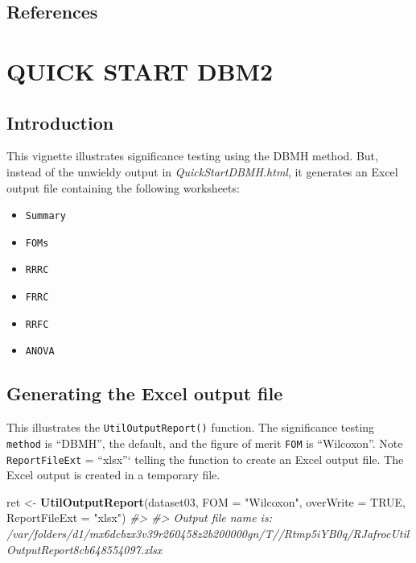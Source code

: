 \documentclass[]{book}
\newenvironment{Shaded}{\begin{snugshade}}{\end{snugshade}}
\newcommand{\CommentTok}[1]{\textcolor[rgb]{0.56,0.35,0.01}{\textit{#1}}}
\newcommand{\DataTypeTok}[1]{\textcolor[rgb]{0.13,0.29,0.53}{#1}}
\newcommand{\KeywordTok}[1]{\textcolor[rgb]{0.13,0.29,0.53}{\textbf{#1}}}
\newcommand{\NormalTok}[1]{#1}
\newcommand{\OtherTok}[1]{\textcolor[rgb]{0.56,0.35,0.01}{#1}}
\newcommand{\StringTok}[1]{\textcolor[rgb]{0.31,0.60,0.02}{#1}}
\providecommand{\tightlist}{%
  \setlength{\itemsep}{0pt}\setlength{\parskip}{0pt}}
\begin{document}
\hypertarget{references-5}{%
\section{References}\label{references-5}}

\hypertarget{QuickStartDBM2}{%
\chapter{QUICK START DBM2}\label{QuickStartDBM2}}

\hypertarget{introduction-5}{%
\section{Introduction}\label{introduction-5}}

This vignette illustrates significance testing using the DBMH method. But, instead of the unwieldy output in \emph{QuickStartDBMH.html}, it generates an Excel output file containing the following worksheets:

\begin{itemize}
\tightlist
\item
  \texttt{Summary}
\item
  \texttt{FOMs}
\item
  \texttt{RRRC}
\item
  \texttt{FRRC}
\item
  \texttt{RRFC}
\item
  \texttt{ANOVA}
\end{itemize}

\hypertarget{generating-the-excel-output-file}{%
\section{Generating the Excel output file}\label{generating-the-excel-output-file}}

This illustrates the \texttt{UtilOutputReport()} function. The significance testing \texttt{method} is ``DBMH'', the default, and the figure of merit \texttt{FOM} is ``Wilcoxon''. Note \texttt{ReportFileExt} = ``xlsx''` telling
the function to create an Excel output file. The Excel output is created in a temporary file.

\begin{Shaded}
\begin{Highlighting}[]
\NormalTok{ret <-}\StringTok{ }\KeywordTok{UtilOutputReport}\NormalTok{(dataset03, }\DataTypeTok{FOM =} \StringTok{"Wilcoxon"}\NormalTok{, }\DataTypeTok{overWrite =} \OtherTok{TRUE}\NormalTok{, }\DataTypeTok{ReportFileExt =} \StringTok{"xlsx"}\NormalTok{)}
\CommentTok{#> }
\CommentTok{#> Output file name is:      /var/folders/d1/mx6dcbzx3v39r260458z2b200000gn/T//Rtmp5iYB0q/RJafrocUtilOutputReport8cb648554097.xlsx}
\end{Highlighting}
\end{Shaded}
\end{document}

